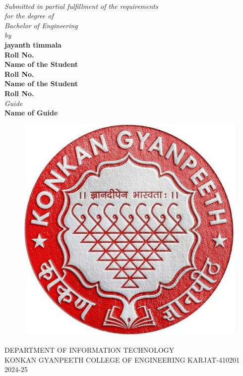 \documentclass[12pt, a4paper, oneside]{Thesis} %
\begin{document}
\begin{titlepage}
\begin{center}

{\huge \bfseries {}}\\[0.10cm] %
 
\large \textit{Submitted in partial fulfillment of the requirements \\ for the degree of \\ Bachelor of Engineering}\\[0.03cm] %
\textit{by}\\[0.03cm]
\textbf{jayanth timmala}\\[0.01cm]
\textbf{Roll No.}\\[0.05cm]
\textbf{Name of the Student}\\[0.01cm]
\textbf{Roll No.}\\[0.05cm]
\textbf{Name of the Student}\\[0.01cm]
\textbf{Roll No.}\\[0.05cm]
\textit{Guide}\\[0.01cm] 
\textbf{Name of Guide}\\[0.35cm]
\begin{figure}[hb!]
 \centering
 \includegraphics[scale=0.9]{Pictures/kgce_logo.png}
\end{figure}
\textsc{DEPARTMENT OF INFORMATION TECHNOLOGY \\[0.01cm]
KONKAN GYANPEETH COLLEGE OF ENGINEERING KARJAT-410201}\\[0.01cm] %
2024-25
\end{center}

\end{titlepage}
\end{document}
